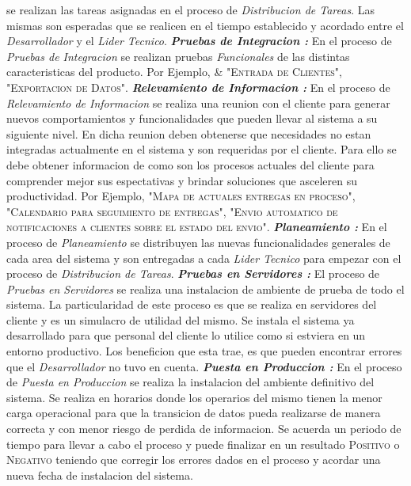 \documentclass[
10pt, %
a4paper, %
oneside, %
headinclude,footinclude, %
BCOR5mm, %
]{scrartcl}
\begin{document}
\begin{flushleft}
  se realizan las tareas asignadas en el proceso de \textit{Distribucion de Tareas}.
  Las mismas son esperadas que se realicen en el tiempo establecido y acordado
  entre el \textit{Desarrollador} y el \textit{Lider Tecnico}.
  \newline  \newline
  \textbf{ \emph{Pruebas de Integracion : } } En el proceso de
  \textit{Pruebas de Integracion} se realizan pruebas \emph{Funcionales} de
  las distintas caracteristicas del producto. Por Ejemplo,
  \newline
  \& "\textsc{Entrada de Clientes}", "\textsc{Exportacion de Datos}".
  \newline  \newline
  \textbf{ \emph{Relevamiento de Informacion : } } En el proceso de
  \textit{Relevamiento de Informacion} se realiza una reunion con el cliente
  para generar nuevos comportamientos y funcionalidades que pueden llevar al
  sistema a su siguiente nivel. En dicha reunion deben obtenerse que necesidades
  no estan integradas actualmente en el sistema y son requeridas por el cliente.
  Para ello se debe obtener informacion de como son los procesos actuales del
  cliente para comprender mejor sus espectativas y brindar soluciones que
  asceleren su productividad.
  Por Ejemplo,
  "\textsc{Mapa de actuales entregas en proceso}",
  "\textsc{Calendario para seguimiento de entregas}",
  "\textsc{Envio automatico de notificaciones a clientes sobre el estado del envio}".
  \newline  \newline
  \textbf{ \emph{Planeamiento : } } En el proceso de \textit{Planeamiento} se
  distribuyen las nuevas funcionalidades generales de cada area del sistema y
  son entregadas a cada \textit{Lider Tecnico} para empezar con el proceso de
  \textit{Distribucion de Tareas}.
  \newline  \newline
  \textbf{ \emph{Pruebas en Servidores : } } El proceso de
  \textit{Pruebas en Servidores} se realiza una instalacion de ambiente
  de prueba de todo el sistema. La particularidad de este proceso es que
  se realiza en servidores del cliente y es un simulacro de utilidad del mismo.
  Se instala el sistema ya desarrollado para que personal del cliente lo
  utilice como si estviera en un entorno productivo. Los beneficion que esta
  trae, es que pueden encontrar errores que el \textit{Desarrollador} no tuvo
  en cuenta.
  \newline  \newline
  \textbf{ \emph{Puesta en Produccion : } } En el proceso de
  \textit{Puesta en Produccion} se realiza la instalacion del ambiente
  definitivo del sistema. Se realiza en horarios donde los operarios del mismo
  tienen la menor carga operacional para que la transicion de datos pueda
  realizarse de manera correcta y con menor riesgo de perdida de informacion.
  Se acuerda un periodo de tiempo para llevar a cabo el proceso y puede
  finalizar en un resultado \textsc{Positivo} o \textsc{Negativo} teniendo
  que corregir los errores dados en el proceso y acordar una nueva fecha de
  instalacion del sistema.
  \end{flushleft}
\end{document}
